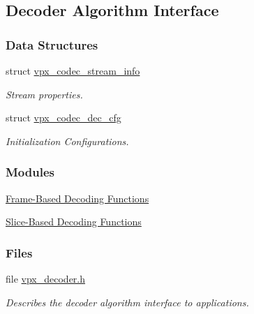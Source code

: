 \hypertarget{group__decoder}{\subsection{\-Decoder \-Algorithm \-Interface}
\label{group__decoder}
}
\subsubsection*{\-Data \-Structures}
\begin{DoxyCompactItemize}
\item 
struct \hyperlink{structvpx__codec__stream__info}{vpx\-\_\-codec\-\_\-stream\-\_\-info}
\begin{DoxyCompactList}\small\item\em \-Stream properties. \end{DoxyCompactList}\item 
struct \hyperlink{structvpx__codec__dec__cfg}{vpx\-\_\-codec\-\_\-dec\-\_\-cfg}
\begin{DoxyCompactList}\small\item\em \-Initialization \-Configurations. \end{DoxyCompactList}\end{DoxyCompactItemize}
\subsubsection*{\-Modules}
\begin{DoxyCompactItemize}
\item 
\hyperlink{group__cap__put__frame}{\-Frame-\/\-Based Decoding Functions}
\item 
\hyperlink{group__cap__put__slice}{\-Slice-\/\-Based Decoding Functions}
\end{DoxyCompactItemize}
\subsubsection*{\-Files}
\begin{DoxyCompactItemize}
\item 
file \hyperlink{vpx__decoder_8h}{vpx\-\_\-decoder.\-h}
\begin{DoxyCompactList}\small\item\em \-Describes the decoder algorithm interface to applications. \end{DoxyCompactList}\end{DoxyCompactItemize}
